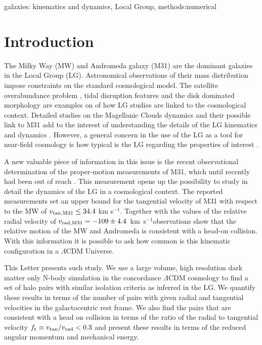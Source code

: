 \documentclass{emulateapj}
\newcommand{\kms}{\,km~s$^{-1}$}
\begin{document}
\begin{keywords}
{galaxies: kinematics and dynamics, Local Group, methods:numerical}
\end{keywords}

\section{Introduction}

The Milky Way (MW) and Andromeda galaxy (M31) are the dominant galaxies in the Local Group (LG). Astronomical observations of their mass distribution impose constraints on the standard cosmological model. The satellite overabundance problem \citep{Klypin99,Moore99}, tidal disruption features \citep{pandas09} and the disk dominated morphology \citep{Kazantzidis2008} are examples on of how LG studies are linked to the cosmological context. Detailed studies on the Magellanic Clouds dynamics and their possible link to M31 add to the interest of understanding the details of the LG kinematics and dynamics \citep{Besla2007,Tollerud2011,Knebe2011,Fouquet2012,Teyssier2012}. However, a general concern in the use of the LG as a tool for near-field cosmology \citep{Freeman2002,Peebles2010} is how typical is the LG regarding the properties of interest \citep{Liu2011,ForeroRomero2011,Purcell2012}. 

A new valuable piece of information in this issue is the recent observational determination of the proper-motion measurements of M31, which until recently had been out of reach \citep{vanderMarel12}. This measurement opens up the possibility to study in detail the dynamics of the LG in a cosmological context. The reported measurements set an upper bound for the tangential velocity of M31 with respect to the MW of $v_{\rm tan,M31}\leq 34.4$ km s$^{-1}$. Together with the values of the relative radial velocity of $v_{\rm rad,M31}=-109\pm 4.4$ \kms observations show that the relative motion of the MW and Andromeda is consistent with a head-on collision. With this information it is possible to ask how common is this kinematic configuration in a $\Lambda$CDM Universe.

This Letter presents such study. We use a large volume, high resolution dark matter only N-body simulation in the concordance $\Lambda$CDM cosmology to find a set of halo pairs with similar isolation criteria as inferred in the LG. We quantify these results in terms of the number of pairs with given radial and tangential velocities in the galactocentric rest frame. We also find the pairs that are consistent with a head on collision in terms of the ratio of the radial to tangential velocity $f_{\rm t}\equiv v_{\rm tan}/v_{\rm rad}<0.3$ and present these results in terms of the reduced angular momentum and mechanical energy.
\end{document}
